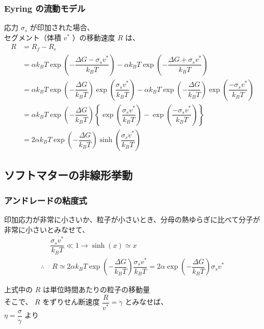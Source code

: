 \documentclass[10pt, dvipdfmx]{beamer}
\begin{document}
\begin{frame}
\frametitle{Eyring の流動モデル}
\Large
応力 $\sigma_s$ が印加された場合、\\セグメント（体積 $v^*$ ）の移動速度 $R$ は、
\small
\begin{align*}
	R
	&= R_f -R_r \\
	&= \alpha k_B T \exp \left( - \dfrac{\Delta G - \sigma_s v^*}{k_BT} \right)
	-\alpha k_B T \exp \left( - \dfrac{\Delta G + \sigma_s v^*}{k_BT} \right) \\
	&= \alpha k_B T \exp \left( - \dfrac{\Delta G}{k_BT} \right) \exp \left(\dfrac{\sigma_s v^*}{k_BT} \right)
	- \alpha k_B T \exp \left( - \dfrac{\Delta G}{k_BT} \right) \exp \left(\dfrac{-\sigma_s v^*}{k_BT} \right)\\
	&= \alpha k_B T \exp \left( - \dfrac{\Delta G}{k_BT} \right) \left\{ \exp \left(\dfrac{\sigma_s v^*}{k_BT} \right)
	- \exp \left(\dfrac{-\sigma_s v^*}{k_BT} \right) \right\} \\
	&= 2 \alpha k_B T \exp \left( - \dfrac{\Delta G}{k_BT} \right) \sinh \left(\dfrac{\sigma_s v^*}{k_BT} \right)
\end{align*}

\end{frame}


\subsection{ソフトマターの非線形挙動}
\begin{frame}
\frametitle{アンドレードの粘度式}
\large
印加応力が非常に小さいか、粒子が小さいとき、分母の熱ゆらぎに比べて分子が非常に小さいとみなせて、
\begin{align*}
& \dfrac{\sigma_s v^*}{k_BT} \ll 1 \rightarrow \sinh(x) \simeq x \\
\therefore &\;  R \simeq 2 \alpha k_B T \exp \left( - \dfrac{\Delta G}{k_BT} \right) \dfrac{\sigma_s v^*}{k_BT}
	=2 \alpha \exp \left( - \dfrac{\Delta G}{k_BT} \right) \sigma_s v^*
\end{align*}

\large
上式中の $R$ は単位時間あたりの粒子の移動量\\
そこで、
$R$ をずりせん断速度 $\dfrac{R}{v^*} = \dot{\gamma}$ とみなせば、\\
$\eta = \dfrac{\sigma}{\dot{\gamma}}$ より
\end{frame}
\end{document}
